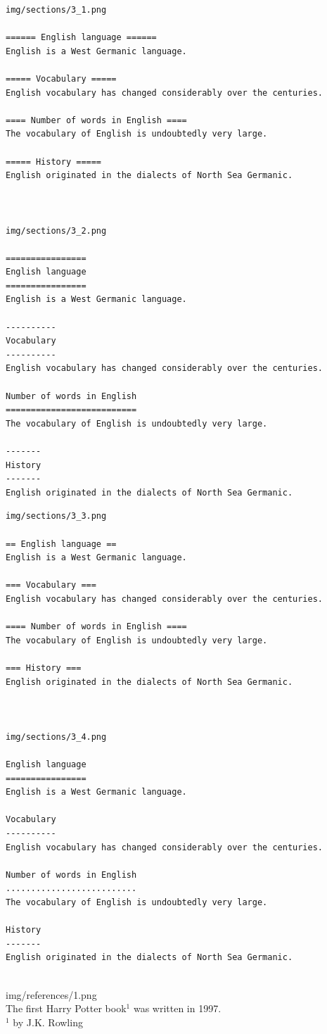 \documentclass[14pt]{article}
\begin{document}
\newpage
\begin{verbatim}
img/sections/3_1.png

====== English language ======
English is a West Germanic language.

===== Vocabulary =====
English vocabulary has changed considerably over the centuries.

==== Number of words in English ====
The vocabulary of English is undoubtedly very large.

===== History =====
English originated in the dialects of North Sea Germanic.



img/sections/3_2.png

================
English language
================
English is a West Germanic language.

----------
Vocabulary
----------
English vocabulary has changed considerably over the centuries.

Number of words in English
==========================
The vocabulary of English is undoubtedly very large.

-------
History
-------
English originated in the dialects of North Sea Germanic.

\end{verbatim}
\newpage
\begin{verbatim}
img/sections/3_3.png

== English language ==
English is a West Germanic language.

=== Vocabulary ===
English vocabulary has changed considerably over the centuries.

==== Number of words in English ====
The vocabulary of English is undoubtedly very large.

=== History ===
English originated in the dialects of North Sea Germanic.



img/sections/3_4.png

English language
================
English is a West Germanic language.

Vocabulary
----------
English vocabulary has changed considerably over the centuries.

Number of words in English
..........................
The vocabulary of English is undoubtedly very large.

History
-------
English originated in the dialects of North Sea Germanic.


\end{verbatim}
\noindent
img/references/1.png\\[.5cm]
The first Harry Potter book$^1$ was written in 1997.\\[1cm]
$^1$ by J.K. Rowling
\end{document}
